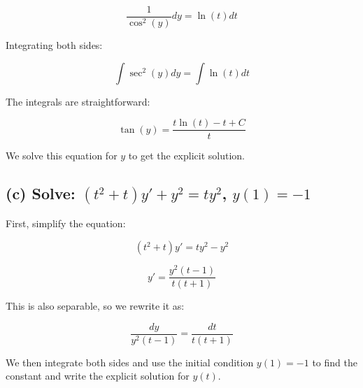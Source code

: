 \documentclass{article}
\begin{document}
\[
\frac{1}{\cos^2(y)} dy = \ln(t) dt
\]

Integrating both sides:

\[
\int \sec^2(y) dy = \int \ln(t) dt
\]

The integrals are straightforward:

\[
\tan(y) = \frac{t \ln(t) - t + C}{t}
\]

We solve this equation for $y$ to get the explicit solution.

\subsection*{(c) Solve: $(t^2 + t)y' + y^2 = ty^2$, $y(1) = -1$}

First, simplify the equation:

\[
(t^2 + t)y' = ty^2 - y^2
\]

\[
y' = \frac{y^2(t - 1)}{t(t + 1)}
\]

This is also separable, so we rewrite it as:

\[
\frac{dy}{y^2(t - 1)} = \frac{dt}{t(t + 1)}
\]

We then integrate both sides and use the initial condition $y(1) = -1$ to find the constant and write the explicit solution for $y(t)$.
\end{document}
